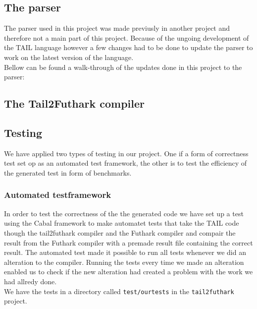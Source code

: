 \documentclass[11pt]{article}
\begin{document}
\subsection{The parser}
The parser used in this project was made previusly in another project \cite{APLACC} and therefore not a main part of this project. Because of the ungoing development of the TAIL language however a few changes had to be done to update the parser to work on the latest version of the language. \\

Bellow can be found a walk-through of the updates done in this project to the parser: \\

\subsection{The Tail2Futhark compiler}

\subsection{Testing}
We have applied two types of testing in our project. One if a form of correctness test set op as an automated test
framework, the other is to test the efficiency of the generated test in form of benchmarks. 

\subsubsection{Automated testframework}
In order to test the correctness of the the generated code we have set up a test using the Cabal framework to make automatet tests that take the TAIL code though the tail2futhark compiler and the Futhark compiler and compair the result from the Futhark compiler with a premade result file containing the correct result. The automated test made it possible to run all tests whenever we did an alteration to the compiler. 
Running the tests every time we made an alteration enabled us to check if the new alteration had created a problem with the work we had allredy done. \\

We have the tests in a directory called {\tt test/ourtests} in the {\tt tail2futhark} project. \\
\end{document}
